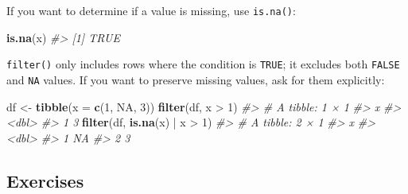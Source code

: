 \documentclass[]{book}
\newenvironment{Shaded}{\begin{snugshade}}{\end{snugshade}}
\newcommand{\KeywordTok}[1]{\textcolor[rgb]{0.13,0.29,0.53}{\textbf{{#1}}}}
\newcommand{\DataTypeTok}[1]{\textcolor[rgb]{0.13,0.29,0.53}{{#1}}}
\newcommand{\DecValTok}[1]{\textcolor[rgb]{0.00,0.00,0.81}{{#1}}}
\newcommand{\StringTok}[1]{\textcolor[rgb]{0.31,0.60,0.02}{{#1}}}
\newcommand{\CommentTok}[1]{\textcolor[rgb]{0.56,0.35,0.01}{\textit{{#1}}}}
\newcommand{\OtherTok}[1]{\textcolor[rgb]{0.56,0.35,0.01}{{#1}}}
\newcommand{\NormalTok}[1]{{#1}}
\begin{document}
If you want to determine if a value is missing, use \texttt{is.na()}:

\begin{Shaded}
\begin{Highlighting}[]
\KeywordTok{is.na}\NormalTok{(x)}
\CommentTok{#> [1] TRUE}
\end{Highlighting}
\end{Shaded}

\texttt{filter()} only includes rows where the condition is
\texttt{TRUE}; it excludes both \texttt{FALSE} and \texttt{NA} values.
If you want to preserve missing values, ask for them explicitly:

\begin{Shaded}
\begin{Highlighting}[]
\NormalTok{df <-}\StringTok{ }\KeywordTok{tibble}\NormalTok{(}\DataTypeTok{x =} \KeywordTok{c}\NormalTok{(}\DecValTok{1}\NormalTok{, }\OtherTok{NA}\NormalTok{, }\DecValTok{3}\NormalTok{))}
\KeywordTok{filter}\NormalTok{(df, x >}\StringTok{ }\DecValTok{1}\NormalTok{)}
\CommentTok{#> # A tibble: 1 × 1}
\CommentTok{#>       x}
\CommentTok{#>   <dbl>}
\CommentTok{#> 1     3}
\KeywordTok{filter}\NormalTok{(df, }\KeywordTok{is.na}\NormalTok{(x) |}\StringTok{ }\NormalTok{x >}\StringTok{ }\DecValTok{1}\NormalTok{)}
\CommentTok{#> # A tibble: 2 × 1}
\CommentTok{#>       x}
\CommentTok{#>   <dbl>}
\CommentTok{#> 1    NA}
\CommentTok{#> 2     3}
\end{Highlighting}
\end{Shaded}

\subsection{Exercises}\label{exercises-7}
\end{document}
